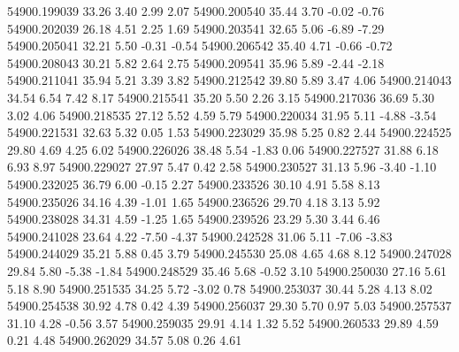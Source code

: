 54900.199039       33.26        3.40        2.99        2.07
54900.200540       35.44        3.70       -0.02       -0.76
54900.202039       26.18        4.51        2.25        1.69
54900.203541       32.65        5.06       -6.89       -7.29
54900.205041       32.21        5.50       -0.31       -0.54
54900.206542       35.40        4.71       -0.66       -0.72
54900.208043       30.21        5.82        2.64        2.75
54900.209541       35.96        5.89       -2.44       -2.18
54900.211041       35.94        5.21        3.39        3.82
54900.212542       39.80        5.89        3.47        4.06
54900.214043       34.54        6.54        7.42        8.17
54900.215541       35.20        5.50        2.26        3.15
54900.217036       36.69        5.30        3.02        4.06
54900.218535       27.12        5.52        4.59        5.79
54900.220034       31.95        5.11       -4.88       -3.54
54900.221531       32.63        5.32        0.05        1.53
54900.223029       35.98        5.25        0.82        2.44
54900.224525       29.80        4.69        4.25        6.02
54900.226026       38.48        5.54       -1.83        0.06
54900.227527       31.88        6.18        6.93        8.97
54900.229027       27.97        5.47        0.42        2.58
54900.230527       31.13        5.96       -3.40       -1.10
54900.232025       36.79        6.00       -0.15        2.27
54900.233526       30.10        4.91        5.58        8.13
54900.235026       34.16        4.39       -1.01        1.65
54900.236526       29.70        4.18        3.13        5.92
54900.238028       34.31        4.59       -1.25        1.65
54900.239526       23.29        5.30        3.44        6.46
54900.241028       23.64        4.22       -7.50       -4.37
54900.242528       31.06        5.11       -7.06       -3.83
54900.244029       35.21        5.88        0.45        3.79
54900.245530       25.08        4.65        4.68        8.12
54900.247028       29.84        5.80       -5.38       -1.84
54900.248529       35.46        5.68       -0.52        3.10
54900.250030       27.16        5.61        5.18        8.90
54900.251535       34.25        5.72       -3.02        0.78
54900.253037       30.44        5.28        4.13        8.02
54900.254538       30.92        4.78        0.42        4.39
54900.256037       29.30        5.70        0.97        5.03
54900.257537       31.10        4.28       -0.56        3.57
54900.259035       29.91        4.14        1.32        5.52
54900.260533       29.89        4.59        0.21        4.48
54900.262029       34.57        5.08        0.26        4.61
